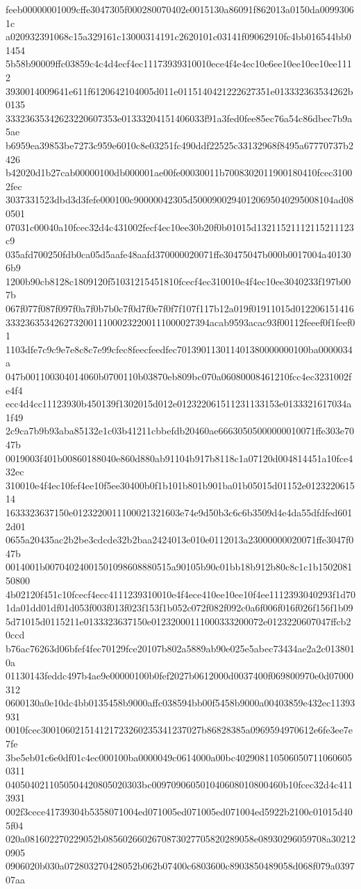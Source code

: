 feeb00000001009cffe3047305f000280070402e0015130a86091f862013a0150da00993061c
a020932391068c15a329161c13000314191c2620101c03141f09062910fc4bb016544bb01454
5b58b90009ffc03859c4c4d4ecf4ec11173939310010ece4f4e4ec10e6ee10ee10ee10ee1112
3930014009641e611f6120642104005d011e0115140421222627351e013332363534262b0135
33323635342623220607353e01333204151406033f91a3fed0fee85ec76a54c86dbec7b9a5ae
b6959ea39853be7273c959e6010c8e03251fc490ddf22525c33132968f8495a67770737b2426
b42020d1b27cab00000100db000001ae00fe00030011b7008302011900180410fcec31002fec
3037331523dbd3d3fefe000100c90000042305d50009002940120695040295008104ad080501
07031c00040a10fcec32d4c431002fecf4ec10ee30b20f0b01015d13211521112115211123c9
035afd700250fdb0ca05d5aafe48aafd370000020071ffe30475047b000b0017004a401306b9
1200b90cb8128c1809120f51031215451810fcecf4ec310010e4f4ec10ee3040233f197b007b
067f077f087f097f0a7f0b7b0c7f0d7f0e7f0f7f107f117b12a019f01911015d012206151416
333236353426273200111000232200111000027394acab9593acac93f00112feeef0f1feef01
1103dfe7c9c9e7e8c8c7e99cfec8feecfeedfec701390113011401380000000100ba0000034a
047b001100304014060b0700110b03870eb809bc070a06080008461210fcc4ec3231002fe4f4
ecc4d4cc11123930b450139f1302015d012e012322061511231133153e0133321617034a1f49
2c9ca7b9b93aba85132e1c03b41211cbbefdb20460ae66630505000000010071ffe303e7047b
0019003f401b00860188040e860d880ab91104b917b8118c1a07120d004814451a10fce432ec
310010e4f4ec10fef4ee10f5ee30400b0f1b101b801b901ba01b05015d01152e012322061514
1633323637150e0123220011100021321603e74e9d50b3c6c6b3509d4e4da55dfdfed6012d01
0655a20435ac2b2be3cdcde32b2baa2424013e010e0112013a23000000020071ffe3047f047b
0014001b00704024001501098608880515a90105b90c01bb18b912b80c8c1c1b150208150800
4b02120f451c10fcecf4ecc4111239310010e4f4ece410ee10ee10f4ee1112393040293f1d70
1da01dd01df01d053f003f013f023f153f1b052c072f082f092c0a6f006f016f026f156f1b09
5d71015d0115211e0133323637150e01232000111000333200072e0123220607047ffcb20ccd
b76ac76263d06bfef4fec70129fce20107b802a5889ab90e025e5abec73434ae2a2c0138010a
01130143feddc497b4ae9e00000100b0fef2027b0612000d0037400f069800970e0d07000312
0600130a0e10dc4bb0135458b9000affc038594bb00f5458b9000a00403859e432ec11393931
0010fcec300106021514121723260235341237027b86828385a0969594970612e6fe3ee7e7fe
3be5eb01c6e0df01c4ec000100ba0000049c0614000a00bc4029081105060507110606050311
0405040211050504420805020303bc009709060501040608010800460b10fcec32d4c4113931
002f3cece41739304b5358071004ed071005ed071005ed071004ed5922b2100c01015d405f04
020a081602270229052b0856026602670873027705820289058e08930296059708a302120905
0906020b030a072803270428052b062b07400c6803600c8903850489058d068f079a039707aa
